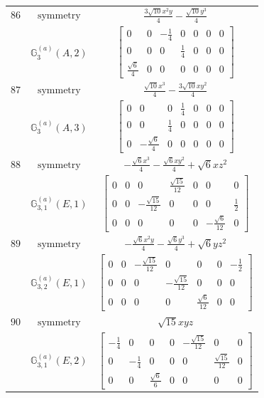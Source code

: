 \documentclass[fleqn,8pt,landscape]{jsarticle}
\begin{document}
\begin{longtable}{ccc}
$ 86 $ & $ \text{symmetry} $ & $ \frac{3 \sqrt{10} x^{2} y}{4} - \frac{\sqrt{10} y^{3}}{4} $ \\
$  $ & $ \mathbb{G}_{3}^{(a)}(A,2) $ & $ \begin{bmatrix} 0 & 0 & - \frac{1}{4} & 0 & 0 & 0 & 0 \\ 0 & 0 & 0 & \frac{1}{4} & 0 & 0 & 0 \\ \frac{\sqrt{6}}{4} & 0 & 0 & 0 & 0 & 0 & 0 \end{bmatrix} $ \\ \hline
$ 87 $ & $ \text{symmetry} $ & $ \frac{\sqrt{10} x^{3}}{4} - \frac{3 \sqrt{10} x y^{2}}{4} $ \\
$  $ & $ \mathbb{G}_{3}^{(a)}(A,3) $ & $ \begin{bmatrix} 0 & 0 & 0 & \frac{1}{4} & 0 & 0 & 0 \\ 0 & 0 & \frac{1}{4} & 0 & 0 & 0 & 0 \\ 0 & - \frac{\sqrt{6}}{4} & 0 & 0 & 0 & 0 & 0 \end{bmatrix} $ \\ \hline
$ 88 $ & $ \text{symmetry} $ & $ - \frac{\sqrt{6} x^{3}}{4} - \frac{\sqrt{6} x y^{2}}{4} + \sqrt{6} x z^{2} $ \\
$  $ & $ \mathbb{G}_{3,1}^{(a)}(E,1) $ & $ \begin{bmatrix} 0 & 0 & 0 & \frac{\sqrt{15}}{12} & 0 & 0 & 0 \\ 0 & 0 & - \frac{\sqrt{15}}{12} & 0 & 0 & 0 & \frac{1}{2} \\ 0 & 0 & 0 & 0 & 0 & - \frac{\sqrt{6}}{12} & 0 \end{bmatrix} $ \\ \hline
$ 89 $ & $ \text{symmetry} $ & $ - \frac{\sqrt{6} x^{2} y}{4} - \frac{\sqrt{6} y^{3}}{4} + \sqrt{6} y z^{2} $ \\
$  $ & $ \mathbb{G}_{3,2}^{(a)}(E,1) $ & $ \begin{bmatrix} 0 & 0 & - \frac{\sqrt{15}}{12} & 0 & 0 & 0 & - \frac{1}{2} \\ 0 & 0 & 0 & - \frac{\sqrt{15}}{12} & 0 & 0 & 0 \\ 0 & 0 & 0 & 0 & \frac{\sqrt{6}}{12} & 0 & 0 \end{bmatrix} $ \\ \hline
$ 90 $ & $ \text{symmetry} $ & $ \sqrt{15} x y z $ \\
$  $ & $ \mathbb{G}_{3,1}^{(a)}(E,2) $ & $ \begin{bmatrix} - \frac{1}{4} & 0 & 0 & 0 & - \frac{\sqrt{15}}{12} & 0 & 0 \\ 0 & - \frac{1}{4} & 0 & 0 & 0 & \frac{\sqrt{15}}{12} & 0 \\ 0 & 0 & \frac{\sqrt{6}}{6} & 0 & 0 & 0 & 0 \end{bmatrix} $ \\ \hline

\end{longtable}
\end{document}
